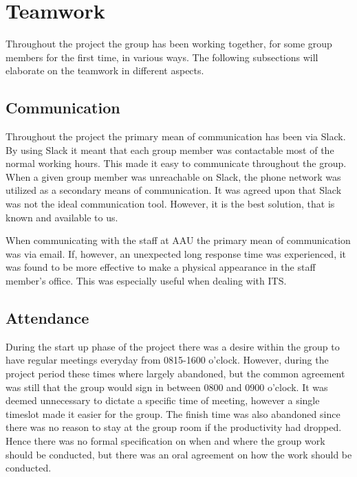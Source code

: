 \section{Teamwork}
Throughout the project the group has been working together, for some group members for the first time, in various ways.
The following subsections will elaborate on the teamwork in different aspects.

\subsection{Communication}
Throughout the project the primary mean of communication has been via Slack.
By using Slack it meant that each group member was contactable most of the normal working hours.
This made it easy to communicate throughout the group.
When a given group member was unreachable on Slack, the phone network was utilized as a secondary means of communication.
It was agreed upon that Slack was not the ideal communication tool.
However, it is the best solution, that is known and available to us.

When communicating with the staff at AAU the primary mean of communication was via email.
If, however, an unexpected long response time was experienced, it was found to be more effective to make a physical appearance in the staff member's office.
This was especially useful when dealing with ITS.

\subsection{Attendance}
During the start up phase of the project there was a desire within the group to have regular meetings everyday from 0815-1600 o'clock.
However, during the project period these times where largely abandoned, but the common agreement was still that the group would sign in between 0800 and 0900 o'clock.
It was deemed unnecessary to dictate a specific time of meeting, however a single timeslot made it easier for the group.
The finish time was also abandoned since there was no reason to stay at the group room if the productivity had dropped.
Hence there was no formal specification on when and where the group work should be conducted, but there was an oral agreement on how the work should be conducted.
